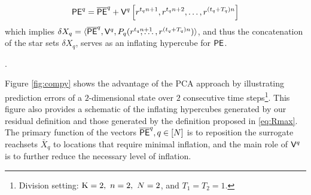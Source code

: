 \begin{equation}
\mathsf{PE}^q = \overline{\mathsf{PE}}^q + \mathsf{V}^{ q}\left[ r^{t_q n+1},r^{t_q n+2}, \ldots, r^{(t_q+T_q)n} \right]
\end{equation}
which implies $\delta X_q = \langle \overline{\PE}^q, \eigvecseg{q}, P_q(r^{t_qn+1}\!\!\!\!\!\!\!\!\!,\ldots,r^{(t_q+T_q)n}) \rangle$, and thus the concatenation of the star sets $\delta X_q$, serves as an inflating hypercube for $\mathsf{PE}$.  

.


\vspace{-3mm}
\begin{remark}
Figure \ref{fig:compy} shows the advantage of the PCA approach by illustrating prediction errors of a $2$-dimensional state over $2$ consecutive time steps\footnote{Division setting: $\mathrm{K} =2,\  n=2,\  N=2$, and $T_1=T_2= 1$.}. This figure also provides a schematic of the inflating hypercubes generated by our residual definition and those generated by the definition proposed in \eqref{eq:Rmax}. The primary function of the vectors $\overline{\mathsf{PE}}^q, q\in[N]$ is to reposition the surrogate reachsets $\bar{X}_q$ to locations that require minimal inflation, and the main role of $\mathsf{V}^{ q}$ is to further reduce the necessary level of inflation.
\end{remark}

